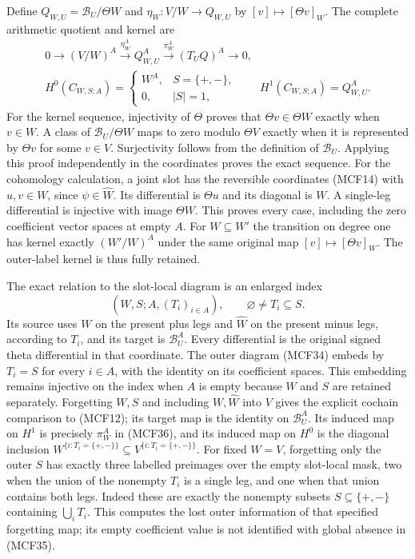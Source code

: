 Define $Q_{W,U}=\mathscr B_U/\Theta W$ and
$\eta_W:V/W\to Q_{W,U}$ by $[v]\mapsto[\Theta v]_W$.
The complete arithmetic quotient and kernel are
\[
\begin{gathered}
0\longrightarrow(V/W)^A\xrightarrow{\eta_W^A}Q_{W,U}^A
       \xrightarrow{\pi_W^A}(T_UQ)^A\longrightarrow0,\\
H^0(C_{W,S;A})=
 \begin{cases}W^A,&S=\{+,-\},\\0,&|S|=1,\end{cases}
\qquad H^1(C_{W,S;A})=Q_{W,U}^A.
\end{gathered}
\tag{MCF36}
\]
For the kernel sequence, injectivity of $\Theta$ proves that
$\Theta v\in\Theta W$ exactly when $v\in W$.  A class of
$\mathscr B_U/\Theta W$ maps to zero modulo $\Theta V$ exactly when
it is represented by $\Theta v$ for some $v\in V$.  Surjectivity
follows from the definition of $\mathscr B_U$.  Applying this proof
independently in the coordinates proves the exact sequence.
For the cohomology calculation, a joint slot has the reversible
coordinates (MCF14) with $u,v\in W$, since $\psi\in\widehat W$.
Its differential is $\Theta u$ and its diagonal is $W$.
A single-leg differential is injective with image $\Theta W$.
This proves every case, including the zero coefficient vector spaces
at empty $A$.  For $W\subseteq W'$ the transition on degree one has
kernel exactly $(W'/W)^A$ under the same original map $[v]\mapsto
[\Theta v]_W$.  The outer-label kernel is thus fully retained.

The exact relation to the slot-local diagram is an enlarged index
\[
(W,S;A,(T_i)_{i\in A}),\qquad
\varnothing\ne T_i\subseteq S.
\tag{MCF37}
\]
Its source uses $W$ on the present plus legs and $\widehat W$ on the
present minus legs, according to $T_i$, and its target is
$\mathscr B_U^A$.  Every differential is the original signed theta
differential in that coordinate.  The outer diagram (MCF34) embeds
by $T_i=S$ for every $i\in A$, with the identity on its coefficient
spaces.  This embedding remains injective on the index when $A$ is
empty because $W$ and $S$ are retained separately.
Forgetting $W,S$ and including $W,\widehat W$ into $V$ gives the
explicit cochain comparison to (MCF12); its target map is the identity
on $\mathscr B_U^A$.  Its induced map on $H^1$ is precisely $\pi_W^A$ in
(MCF36), and its induced map on $H^0$ is the diagonal inclusion
$W^{\{i:T_i=\{+,-\}\}}\subseteq V^{\{i:T_i=\{+,-\}\}}$.
For fixed $W=V$, forgetting only the outer $S$ has exactly three
labelled preimages over the empty slot-local mask, two when the union
of the nonempty $T_i$ is a single leg, and one when that union contains
both legs.  Indeed these are exactly the nonempty subsets
$S\subseteq\{+,-\}$ containing $\bigcup_iT_i$.
This computes the lost outer information of that specified forgetting
map; its empty coefficient value is not identified with global
absence in (MCF35).

